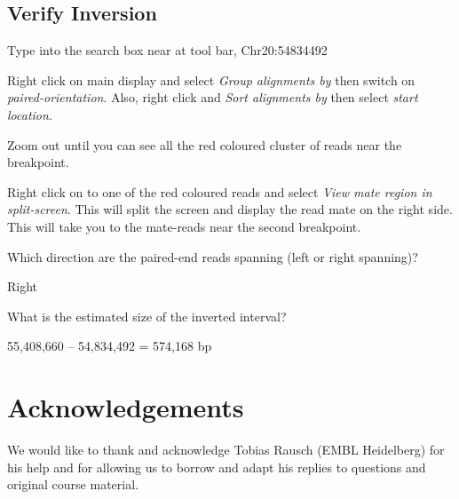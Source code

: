 \subsection{Verify Inversion}
\begin{advanced}
\begin{steps}

Type into the search box near at tool bar, Chr20:54834492 

Right click on main display and select \emph{Group alignments by} then switch on \emph{paired-orientation}. Also, right click and \emph{Sort alignments by} then select \emph{start location}. 

Zoom out until you can see all the red coloured cluster of reads near the breakpoint. 

Right click on to one of the red coloured reads and select \emph{View mate region in split-screen}. This will split the screen and display the read mate on the right side. This will take you to the mate-reads near the second breakpoint. 
\end{steps}
\end{advanced}


\begin{questions}
Which direction are the paired-end reads spanning (left or right spanning)?  
\begin{answer}
Right
\end{answer}
What is the estimated size of the inverted interval? 
\begin{answer}
55,408,660 – 54,834,492 = 574,168 bp
\end{answer}
\end{questions}

\section{Acknowledgements}

We would like to thank and acknowledge Tobias Rausch (EMBL Heidelberg) for his help and for allowing us to borrow and adapt his replies to questions and original course material. 

